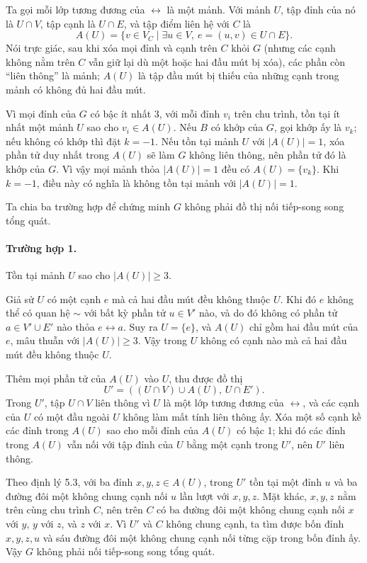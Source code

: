 \documentclass[11pt]{article}
\begin{document}
Ta gọi mỗi lớp tương đương của \(\leftrightarrow\) là một mảnh. Với mảnh \(U\),
tập đỉnh của nó là \(U\cap V\), tập cạnh là \(U\cap E\), và tập điểm liên hệ
với \(C\) là
\[
  A(U)=\{v\in V_C\mid \exists u\in V,\ e=(u,v)\in U\cap E\}.
\]
Nói trực giác, sau khi xóa mọi đỉnh và cạnh trên \(C\) khỏi \(G\) (nhưng các
cạnh không nằm trên \(C\) vẫn giữ lại dù một hoặc hai đầu mút bị xóa), các
phần còn ``liên thông'' là mảnh; \(A(U)\) là tập đầu mút bị thiếu của những
cạnh trong mảnh có không đủ hai đầu mút.

Vì mọi đỉnh của \(G\) có bậc ít nhất 3, với mỗi đỉnh \(v_i\) trên chu trình,
tồn tại ít nhất một mảnh \(U\) sao cho \(v_i\in A(U)\). Nếu \(B\) có khớp của
\(G\), gọi khớp ấy là \(v_k\); nếu không có khớp thì đặt \(k=-1\). Nếu tồn tại
mảnh \(U\) với \(|A(U)|=1\), xóa phần tử duy nhất trong \(A(U)\) sẽ làm \(G\)
không liên thông, nên phần tử đó là khớp của \(G\). Vì vậy mọi mảnh thỏa
\(|A(U)|=1\) đều có \(A(U)=\{v_k\}\). Khi \(k=-1\), điều này có nghĩa là không
tồn tại mảnh với \(|A(U)|=1\).

Ta chia ba trường hợp để chứng minh \(G\) không phải đồ thị nối tiếp-song song
tổng quát.

\paragraph{Trường hợp 1.}
Tồn tại mảnh \(U\) sao cho \(|A(U)|\ge3\).

Giả sử \(U\) có một cạnh \(e\) mà cả hai đầu mút đều không thuộc \(U\). Khi đó
\(e\) không thể có quan hệ \(\sim\) với bất kỳ phần tử \(u\in V'\) nào, và do
đó không có phần tử \(a\in V'\cup E'\) nào thỏa \(e\leftrightarrow a\). Suy
ra \(U=\{e\}\), và \(A(U)\) chỉ gồm hai đầu mút của \(e\), mâu thuẫn với
\(|A(U)|\ge3\). Vậy trong \(U\) không có cạnh nào mà cả hai đầu mút đều không
thuộc \(U\).

Thêm mọi phần tử của \(A(U)\) vào \(U\), thu được đồ thị
\[
  U'=((U\cap V)\cup A(U),\,U\cap E').
\]
Trong \(U'\), tập \(U\cap V\) liên thông vì \(U\) là một lớp tương đương của
\(\leftrightarrow\), và các cạnh của \(U\) có một đầu ngoài \(U\) không làm
mất tính liên thông ấy. Xóa một số cạnh kề các đỉnh trong \(A(U)\) sao cho
mỗi đỉnh của \(A(U)\) có bậc 1; khi đó các đỉnh trong \(A(U)\) vẫn nối với tập
đỉnh của \(U\) bằng một cạnh trong \(U'\), nên \(U'\) liên thông.

Theo định lý 5.3, với ba đỉnh \(x,y,z\in A(U)\), trong \(U'\) tồn tại một đỉnh
\(u\) và ba đường đôi một không chung cạnh nối \(u\) lần lượt với \(x,y,z\).
Mặt khác, \(x,y,z\) nằm trên cùng chu trình \(C\), nên trên \(C\) có ba đường
đôi một không chung cạnh nối \(x\) với \(y\), \(y\) với \(z\), và \(z\) với
\(x\). Vì \(U'\) và \(C\) không chung cạnh, ta tìm được bốn đỉnh \(x,y,z,u\)
và sáu đường đôi một không chung cạnh nối từng cặp trong bốn đỉnh ấy. Vậy
\(G\) không phải nối tiếp-song song tổng quát.
\end{document}
